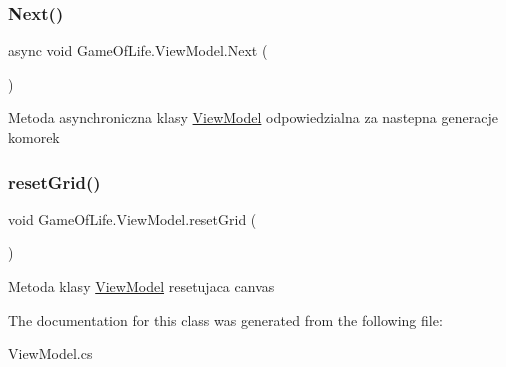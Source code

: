 \subsubsection{\texorpdfstring{Next()}{Next()}}
{\footnotesize\ttfamily async void Game\+Of\+Life.\+View\+Model.\+Next (\begin{DoxyParamCaption}{ }\end{DoxyParamCaption})\hspace{0.3cm}{\ttfamily [inline]}}



Metoda asynchroniczna klasy \mbox{\hyperlink{class_game_of_life_1_1_view_model}{View\+Model}} odpowiedzialna za nastepna generacje komorek 

\mbox{\label{class_game_of_life_1_1_view_model_a531b06fc7461978e79d78314bcb4c25d}} 
\subsubsection{\texorpdfstring{resetGrid()}{resetGrid()}}
{\footnotesize\ttfamily void Game\+Of\+Life.\+View\+Model.\+reset\+Grid (\begin{DoxyParamCaption}{ }\end{DoxyParamCaption})\hspace{0.3cm}{\ttfamily [inline]}}



Metoda klasy \mbox{\hyperlink{class_game_of_life_1_1_view_model}{View\+Model}} resetujaca canvas 



The documentation for this class was generated from the following file\+:\begin{DoxyCompactItemize}
\item 
View\+Model.\+cs\end{DoxyCompactItemize}
